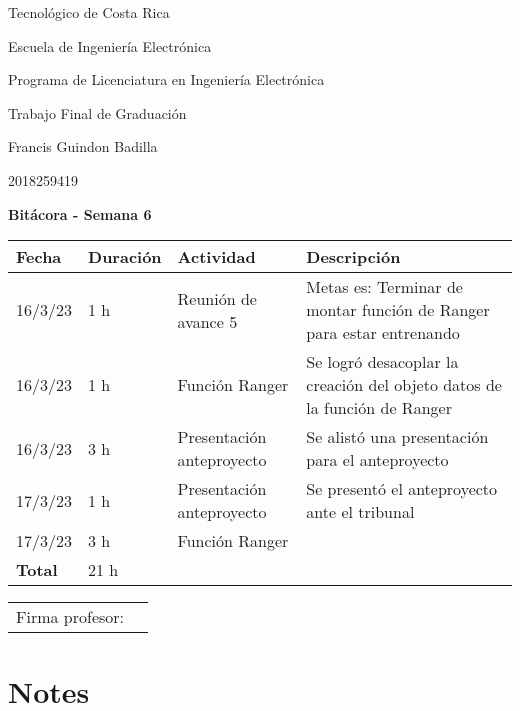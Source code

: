 \documentclass[12pt,oneside]{book}
\begin{document}
 \graphicspath{{./}{../tesis/fig/}}
  Tecnológico de Costa Rica
  \par\vspace{1mm}
  Escuela de Ingeniería Electrónica
  \par\vspace{1mm}
  Programa de Licenciatura en Ingeniería Electrónica
  \par\vspace{10mm}
  Trabajo Final de Graduación
  \par\vspace{1mm}
  Francis Guindon Badilla
  \par\vspace{1mm}
  2018259419
  \par\vspace{10mm}
  \large\textbf{Bitácora - Semana 6}
  \par\vspace{10mm}
  \small

  \begin{table} [!h]
    \centering
    \small
    \begin{tabular}{p{1.5 cm} p{2.1 cm} p{5 cm} p{8 cm}}
      \hline
      Fecha & Duración & Actividad & Descripción \\
      \hline
      16/3/23 & 1 h & Reunión de avance 5 & Metas es: Terminar de montar función de Ranger para estar entrenando \\
      16/3/23 & 1 h & Función Ranger & Se logró desacoplar la creación del objeto datos de la función de Ranger \\
      16/3/23 & 3 h & Presentación anteproyecto & Se alistó una presentación para el anteproyecto \\
      17/3/23 & 1 h & Presentación anteproyecto & Se presentó el anteproyecto ante el tribunal \\
      17/3/23 & 3 h & Función Ranger &  \\
      \hline
      \textbf{Total} & 21 h \\
      \hline
    \end{tabular}
  \end{table}
  
  \vfill

  \begin{tabular}{p{3 cm} p{10 cm}}
    Firma profesor: & \\
    \cline{2-2}
  \end{tabular}

  \newpage

  \section*{Notes}
  \setlength\parindent{0pt}
\end{document}
